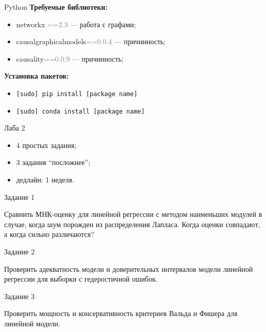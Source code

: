 \documentclass[9pt,pdf,utf8,hyperref={unicode},aspectratio=169]{beamer}
\begin{document}
\iffalse
\begin{frame}{Python}
    \textbf{Требуемые библиотеки:}\\
    \begin{itemize}
    \item networkx\textcolor{gray}{ ==2.3} --- работа с графами;
    \item causalgraphicalmodels\textcolor{gray}{==0.0.4} --- причинность;
    \item causality\textcolor{gray}{==0.0.9} --- причинность;
    \end{itemize}
    \bf{Установка пакетов:}\\
    \begin{itemize}
    
    \item \tt{[sudo] pip install [package name]}
    \item \tt{[sudo] conda install [package name]}

    \end{itemize}
\end{frame}
\begin{frame}{Лаба 2}
\begin{itemize}
\item 4 простых задания;
\item 3 задания ``посложнее'';
\item дедлайн: 1 неделя.
\end{itemize}
\end{frame}

\begin{frame}{Задание 1}
\begin{block}{}
Сравнить МНК-оценку для линейной регрессии с методом наименьших модулей в случае, когда шум порожден из распределения Лапласа.
Когда оценки совпадают, а когда сильно различаются? 
\end{block}
\end{frame}

\begin{frame}{Задание 2}
\begin{block}{}
Проверить адекватность модели и доверительных интервалов модели линейной регрессии для выборки с гедеростичной ошибок.
\end{block}
\end{frame}


\begin{frame}{Задание 3}
\begin{block}{}
Проверить мощность и консервативность критериев Вальда и Фишера для линейной модели.
\end{block}
\end{frame}
\end{document}
